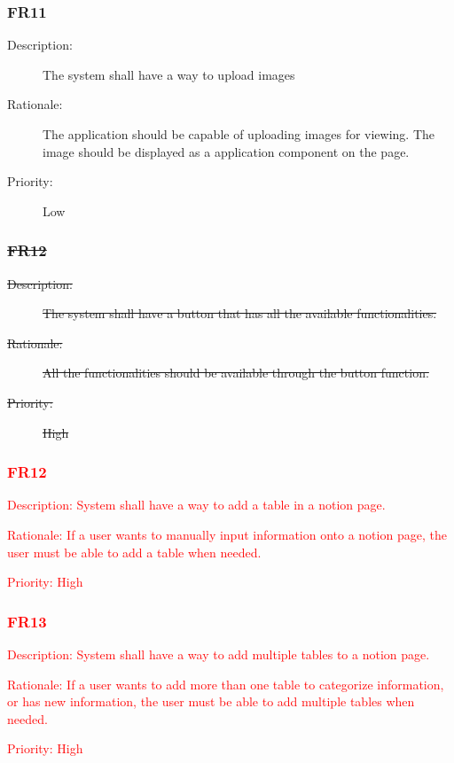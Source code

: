 \documentclass[12pt, titlepage]{article}
\begin{document}
\subsubsection{FR11}

\begin{description}
  \item[Description:] The system shall have a way to upload images
  \item[Rationale:] The application should be capable of uploading images for viewing. The image should be displayed as a application component on the page.
  \item[Priority:] Low
\end{description}

\subsubsection{\sout{FR12}}

\begin{description}
  \item[\sout{Description:}] \sout{The system shall have a button that has all the available functionalities.}
  \item[\sout{Rationale:}] \sout{All the functionalities should be available through the button function.}
  \item[\sout{Priority:}] \sout{High}
\end{description}

\subsubsection{\textcolor{red}{FR12}}

\begin{description}
	\item \textcolor{red}{Description: System shall have a way to add a table in a notion page.}
	\item \textcolor{red}{Rationale: If a user wants to manually input information onto a notion page, the user must be able to add a table when needed.}
	\item \textcolor{red}{Priority: High}
\end{description}

\subsubsection{\textcolor{red}{FR13}}

\begin{description}
	\item \textcolor{red}{Description: System shall have a way to add multiple tables to a notion page.}
	\item \textcolor{red}{Rationale: If a user wants to add more than one table to categorize information, or has new information, the user must be able to add multiple tables when needed.}
	\item \textcolor{red}{Priority: High}
\end{description}
\end{document}
